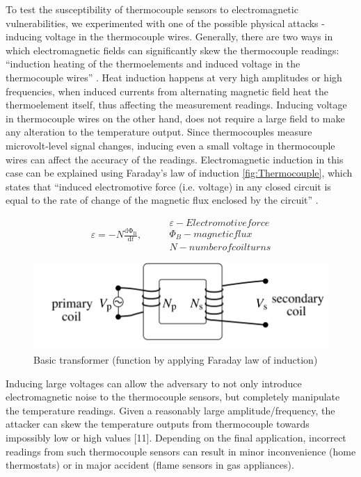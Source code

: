 To test the susceptibility of thermocouple sensors to electromagnetic vulnerabilities, we experimented with one of the possible physical attacks - inducing voltage in the thermocouple wires. Generally, there are two ways in which electromagnetic fields can significantly skew the thermocouple readings: ``induction heating of the thermoelements and induced voltage in the thermocouple wires'' \cite{Omega17}. Heat induction happens at very high amplitudes or high frequencies, when induced currents from alternating magnetic field heat the thermoelement itself, thus affecting the measurement readings. Inducing voltage in thermocouple wires on the other hand, does not require a large field to make any alteration to the temperature output. Since thermocouples measure microvolt-level signal changes, inducing even a small voltage in thermocouple wires can affect the accuracy of the readings. Electromagnetic induction in this case can be explained using Faraday's law of induction \cref{fig:Thermocouple}, which states that ``induced electromotive force (i.e. voltage) in any closed circuit is equal to the rate of change of the magnetic flux enclosed by the circuit'' \cite{Jordan68}. 

\begin{equation}
\begin{split}
\varepsilon = - N\frac{\mathrm{d\Phi _{B}} }{\mathrm{d} t},
\end{split}
\qquad
\begin{split}
\varepsilon - Electromotive force\\
{\Phi _{B}} - magnetic flux\\
N - number of coil turns
\end{split}
\end{equation}

\begin{figure}[h]
    \centering
    \includegraphics[width=\linewidth]{pictures/FLaw.png}
    \caption{Basic transformer (function by applying Faraday law of induction) \cite{Flap96}}
    \label{fig:Transformer}
\end{figure}


Inducing large voltages can allow the adversary to not only introduce electromagnetic noise to the thermocouple sensors, but completely manipulate the temperature readings. Given a reasonably large amplitude/frequency, the attacker can skew the temperature outputs from thermocouple towards impossibly low or high values [11]. Depending on the final application, incorrect readings from such thermocouple sensors can result in minor inconvenience (home thermostats) or in major accident (flame sensors in gas appliances). 

